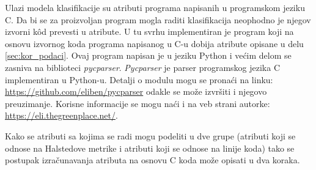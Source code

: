 \documentclass[12pt,oneside]{memoir}
\begin{document}
Ulazi modela klasifikacije su atributi programa napisanih u programskom jeziku C. Da bi se za proizvoljan program mogla raditi klasifikacija neophodno je njegov izvorni k\^od prevesti u atribute. U tu svrhu implementiran je program koji na osnovu izvornog koda programa napisanog u C-u dobija atribute opisane u delu \ref{sec:kor_podaci}. Ovaj program napisan je u jeziku Python i većim delom se zasniva na biblioteci \textit{pycparser}. \textit{Pycparser} je parser programskog jezika C implementiran u Python-u. Detalji o modulu mogu se pronaći na linku: \url{https://github.com/eliben/pycparser} odakle se može izvršiti i njegovo preuzimanje. Korisne informacije se mogu naći i na veb strani autorke: \url{https://eli.thegreenplace.net/}.

Kako se atributi sa kojima se radi mogu podeliti u dve grupe (atributi koji se odnose na Halstedove metrike i atributi koji se odnose na linije koda) tako se postupak izračunavanja atributa na osnovu C koda može opisati u dva koraka. 
\end{document}
